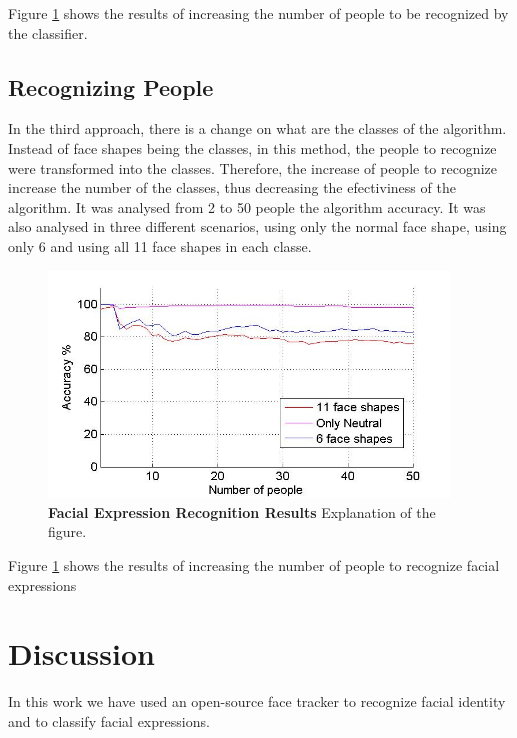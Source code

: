 \documentclass[]{article}
\begin{document}
Figure \ref{feRecognition} shows the results of increasing the number of people
to be recognized by the classifier.

\subsection{Recognizing People}

In the third approach, there is a change on what are the classes of the
algorithm. Instead of face shapes being the classes, in this method, the people
to recognize were transformed into the classes. Therefore, the increase of
people to recognize increase the number of the classes, thus decreasing the
efectiviness of the algorithm. It was analysed from 2 to 50 people the algorithm
accuracy. It was also analysed in three different scenarios, using only the
normal face shape, using only 6 and using all 11 face shapes in each classe.
 


\begin{figure}[ht]
\begin{center}
\vspace{-3mm}
\includegraphics[width=0.95\textwidth]{figures/peopleRecognition4.jpg}
\end{center}
\caption{\textbf{Facial Expression Recognition Results} Explanation of the figure.}
\label{feRecognition}
\end{figure}


Figure \ref{feRecognition} shows the results of increasing the number of people
to recognize facial expressions


\section{Discussion}
In this work we have used an open-source face tracker to recognize facial identity and to classify facial expressions.




\end{document}
